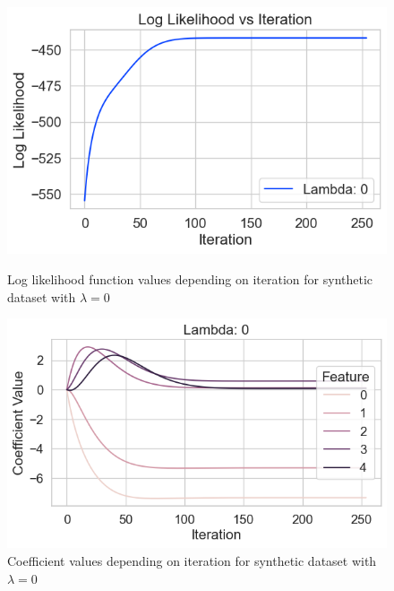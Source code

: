 \documentclass[11pt]{article}
\begin{document}
\begin{figure}[h]
    \centering
    \begin{minipage}{0.48\textwidth}
        \centering
        \includegraphics[width=\textwidth]{../results/log_likelihood_synthetic_dataset_lambda_0.png}
        \caption{Log likelihood function values depending on iteration for synthetic dataset with $\lambda=0$}
        \label{fig:log-likelihood-synthetic-dataset-lambda-0}
    \end{minipage}
    \hfill
    \begin{minipage}{0.48\textwidth}
        \centering
        \includegraphics[width=\textwidth]{../results/coefficients_synthetic_dataset_lambda_0.png}
        \caption{Coefficient values depending on iteration for synthetic dataset with $\lambda=0$}
        \label{fig:coefficients-synthetic-dataset-lambda-0}
    \end{minipage}
\end{figure}
\end{document}
